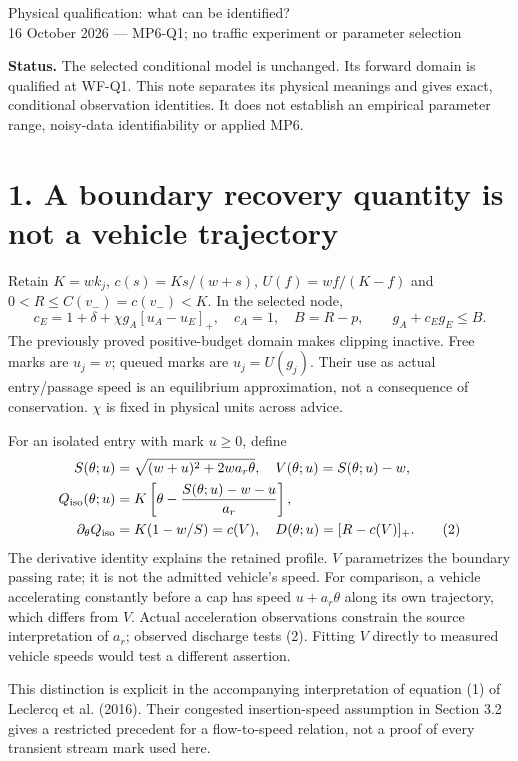 \documentclass[11pt,a4paper]{article}
\newcommand{\pos}[1]{[#1]_+}
\begin{document}
\begin{center}
{\Large Physical qualification: what can be identified?}\\[4pt]
16 October 2026 --- MP6-Q1; no traffic experiment or parameter selection
\end{center}

\textbf{Status.} The selected conditional model is unchanged. Its forward
domain is qualified at WF-Q1. This note separates its physical meanings
and gives exact, conditional observation identities. It does not establish
an empirical parameter range, noisy-data identifiability or applied MP6.

\section*{1. A boundary recovery quantity is not a vehicle trajectory}
Retain $K=wk_j$, $c(s)=Ks/(w+s)$, $U(f)=wf/(K-f)$ and
$0<R\leq C(v_-)=c(v_-)<K$. In the selected node,
\begin{equation}
 c_E=1+\delta+\chi g_A\pos{u_A-u_E},\quad c_A=1,\quad
 B=R-p,\qquad g_A+c_Eg_E\leq B. \tag{1}
\end{equation}
The previously proved positive-budget domain makes clipping inactive.
Free marks are $u_j=v$; queued marks are $u_j=U(g_j)$. Their use as actual
entry/passage speed is an equilibrium approximation, not a consequence of
conservation. $\chi$ is fixed in physical units across advice.

For an isolated entry with mark $u\geq0$, define
\begin{align}
 S(\theta;u)&=\sqrt{(w+u)^2+2wa_r\theta},\quad
 V(\theta;u)=S(\theta;u)-w,\nonumber\\
 Q_{\rm iso}(\theta;u)&=K\left[\theta-
        \frac{S(\theta;u)-w-u}{a_r}\right],\nonumber\\
 \partial_\theta Q_{\rm iso}&=K(1-w/S)=c(V),\quad
 D(\theta;u)=\pos{R-c(V)}. \tag{2}
\end{align}
The derivative identity explains the retained profile. $V$ parametrizes
the boundary passing rate; it is not the admitted vehicle's speed.
For comparison, a vehicle accelerating constantly before a cap has speed
$u+a_r\theta$ along its own trajectory, which differs from $V$.
Actual acceleration observations constrain the source interpretation of
$a_r$; observed discharge tests (2). Fitting $V$ directly to measured vehicle
speeds would test a different assertion.

This distinction is explicit in the accompanying interpretation of equation
(1) of Leclercq et al. (2016). Their congested insertion-speed assumption in
Section 3.2 gives a restricted precedent for a flow-to-speed relation, not
a proof of every transient stream mark used here.
\end{document}
